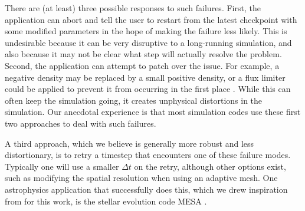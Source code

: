 \documentclass[times,modern]{elsarticle}
\begin{document}
There are (at least) three possible responses to such failures. First, the application can abort and tell the user
to restart from the latest checkpoint with some modified parameters in the hope of making the failure less likely.
This is undesirable because it can be very disruptive to a long-running simulation, and also because it may not be
clear what step will actually resolve the problem. Second, the application can attempt to patch over the issue.
For example, a negative density may be replaced by a small positive density, or a flux limiter could be applied
to prevent it from occurring in the first place \citep{positivity_preserving}. While this can often keep the
simulation going, it creates unphysical distortions in the simulation. Our anecdotal experience is that most
simulation codes use these first two approaches to deal with such failures.

A third approach, which we believe is generally more robust and less distortionary, is to retry a timestep
that encounters one of these failure modes. Typically one will use a smaller $\Delta t$ on the retry, although
other options exist, such as modifying the spatial resolution when using an adaptive mesh. One astrophysics
application that successfully does this, which we drew inspiration from for this work, is the stellar evolution
code MESA \citep{MESA}.




\end{document}
